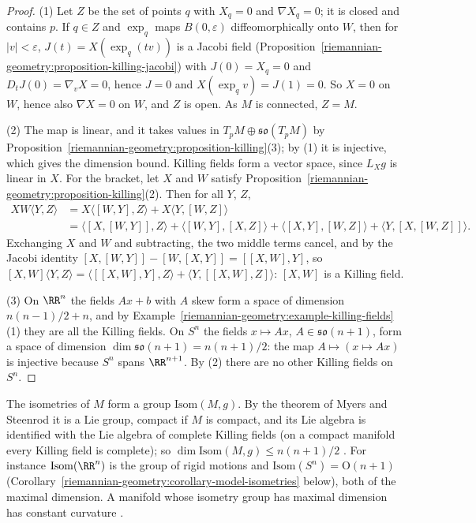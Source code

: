 \begin{proof}
(1) Let $Z$ be the set of points $q$ with $X_q = 0$ and $\nabla X_q = 0$; it is closed and contains $p$. If $q \in Z$ and $\exp_q$ maps $B(0, \varepsilon)$
diffeomorphically onto $W$, then for $|v| < \varepsilon$, $J(t) = X(\exp_q(tv))$ is a Jacobi field (Proposition~\ref{riemannian-geometry:proposition-killing-jacobi}) with
$J(0) = X_q = 0$ and $D_tJ(0) = \nabla_vX = 0$, hence $J = 0$ and $X(\exp_qv) = J(1) = 0$. So $X = 0$ on $W$, hence also $\nabla X = 0$ on $W$, and $Z$ is open. As $M$
is connected, $Z = M$.

(2) The map is linear, and it takes values in $T_pM \oplus \mathfrak{so}(T_pM)$ by Proposition~\ref{riemannian-geometry:proposition-killing}(3); by (1) it is
injective, which gives the dimension bound. Killing fields form a vector space, since $L_Xg$ is linear in $X$. For the bracket, let $X$ and $W$ satisfy
Proposition~\ref{riemannian-geometry:proposition-killing}(2). Then for all $Y$, $Z$,
\[
\begin{aligned}
XW\langle Y, Z\rangle &= X\langle[W, Y], Z\rangle + X\langle Y, [W, Z]\rangle \\
&= \langle[X, [W, Y]], Z\rangle + \langle[W, Y], [X, Z]\rangle + \langle[X, Y], [W, Z]\rangle + \langle Y, [X, [W, Z]]\rangle .
\end{aligned}
\]
Exchanging $X$ and $W$ and subtracting, the two middle terms cancel, and by the Jacobi identity $[X, [W, Y]] - [W, [X, Y]] = [[X, W], Y]$, so
$[X, W]\langle Y, Z\rangle = \langle[[X, W], Y], Z\rangle + \langle Y, [[X, W], Z]\rangle$: $[X, W]$ is a Killing field.

(3) On $\RR^n$ the fields $Ax + b$ with $A$ skew form a space of dimension $n(n - 1)/2 + n$, and by
Example~\ref{riemannian-geometry:example-killing-fields}(1) they are all the Killing fields. On $S^n$ the fields $x \mapsto Ax$, $A \in \mathfrak{so}(n + 1)$, form a space of
dimension $\dim\mathfrak{so}(n + 1) = n(n + 1)/2$: the map $A \mapsto (x \mapsto Ax)$ is injective because $S^n$ spans $\RR^{n+1}$. By (2) there are no other Killing
fields on $S^n$.
\end{proof}

\begin{remark}\label{riemannian-geometry:remark-myers-steenrod}
The isometries of $M$ form a group $\mathrm{Isom}(M, g)$. By the theorem of Myers and Steenrod it is a Lie group, compact if $M$ is compact, and its Lie algebra is
identified with the Lie algebra of complete Killing fields (on a compact manifold every Killing field is complete); so
$\dim\mathrm{Isom}(M, g) \leq n(n + 1)/2$ \cite[Chapter VI]{kobayashi-nomizu}. For instance $\mathrm{Isom}(\RR^n)$ is the group of rigid motions and
$\mathrm{Isom}(S^n) = \mathrm{O}(n + 1)$ (Corollary~\ref{riemannian-geometry:corollary-model-isometries} below), both of the maximal dimension. A manifold whose isometry
group has maximal dimension has constant curvature \cite[Chapter VI]{kobayashi-nomizu}.
\end{remark}

